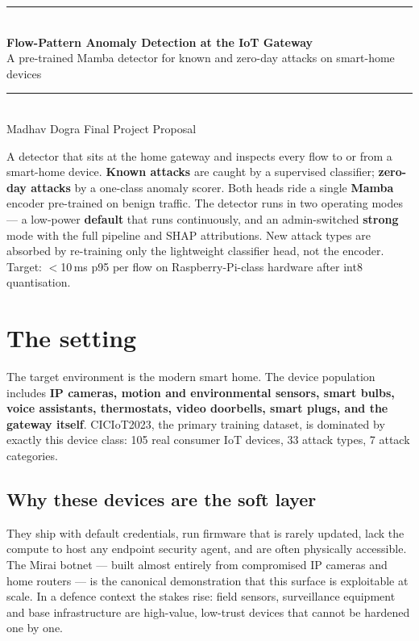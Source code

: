\documentclass[11pt,a4paper]{article}
\begin{document}
\begin{center}
{\color{primary}\rule{\linewidth}{1pt}}\\[6pt]
{\Huge\bfseries\color{ink} Flow-Pattern Anomaly Detection at the IoT Gateway} \\[6pt]
{\Large\color{secondary} A pre-trained Mamba detector for known and zero-day attacks on smart-home devices} \\[4pt]
{\color{mute}\rule{0.6\linewidth}{0.3pt}}\\[4pt]
{\normalsize\color{mute} Madhav Dogra \quad\textbullet\quad Final Project Proposal}
\end{center}

\vspace{4pt}

\begin{tcolorbox}[snap]
A detector that sits at the home gateway and inspects every flow to or from a smart-home device. \textbf{Known attacks} are caught by a supervised classifier; \textbf{zero-day attacks} by a one-class anomaly scorer. Both heads ride a single \textbf{Mamba} encoder pre-trained on benign traffic. The detector runs in two operating modes --- a low-power \textbf{default} that runs continuously, and an admin-switched \textbf{strong} mode with the full pipeline and SHAP attributions. New attack types are absorbed by re-training only the lightweight classifier head, not the encoder. Target: $<$10\,ms p95 per flow on Raspberry-Pi-class hardware after int8 quantisation.
\end{tcolorbox}

\section{The setting}

The target environment is the modern smart home. The device population includes \textbf{IP cameras, motion and environmental sensors, smart bulbs, voice assistants, thermostats, video doorbells, smart plugs, and the gateway itself}. CICIoT2023, the primary training dataset, is dominated by exactly this device class: 105 real consumer IoT devices, 33 attack types, 7 attack categories.

\subsection{Why these devices are the soft layer}
They ship with default credentials, run firmware that is rarely updated, lack the compute to host any endpoint security agent, and are often physically accessible. The Mirai botnet --- built almost entirely from compromised IP cameras and home routers --- is the canonical demonstration that this surface is exploitable at scale. In a defence context the stakes rise: field sensors, surveillance equipment and base infrastructure are high-value, low-trust devices that cannot be hardened one by one.
\end{document}
